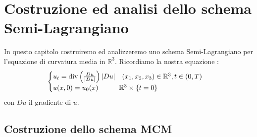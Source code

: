 \chapter{Costruzione ed analisi dello schema Semi-Lagrangiano}
In questo capitolo costruiremo ed analizzeremo uno schema Semi-Lagrangiano per l'equazione di curvatura media in $\mathbb{R}^3$.
Ricordiamo la nostra equazione :
\begin{equation}
\label{eq:cp3-01}
\begin{cases}
u_t = \operatorname{div}\left(\frac{Du}{|Du|}\right)|Du|\quad (x_1,x_2,x_3)\in\mathbb{R}^3,t\in(0,T) \\
u(x,0) = u_0(x) \qquad \quad \mathbb{R}^3\times\{t = 0\}
\end{cases}
\end{equation}
con $Du$ il gradiente di $u$.
%
\section{Costruzione dello schema MCM}

